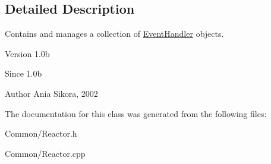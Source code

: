 \subsection{Detailed Description}
Contains and manages a collection of \hyperlink{class_common_1_1_event_handler}{Event\-Handler} objects. 

\begin{DoxyVersion}{Version}
1.\-0b 
\end{DoxyVersion}
\begin{DoxySince}{Since}
1.\-0b 
\end{DoxySince}
\begin{DoxyAuthor}{Author}
Ania Sikora, 2002 
\end{DoxyAuthor}


The documentation for this class was generated from the following files\-:\begin{DoxyCompactItemize}
\item 
Common/Reactor.\-h\item 
Common/Reactor.\-cpp\end{DoxyCompactItemize}
